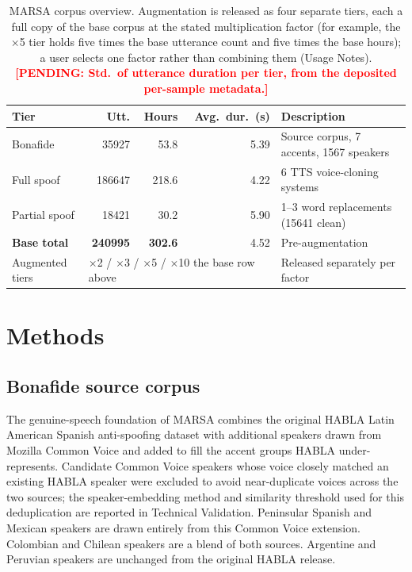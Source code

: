 \documentclass[11pt]{article}
\newcommand{\PENDING}[1]{\textcolor{red}{\textbf{[PENDING: #1]}}}
\begin{document}
\begin{table}[t]
\centering
\caption{MARSA corpus overview. Augmentation is released as four
separate tiers, each a full copy of the base corpus at the stated
multiplication factor (for example, the $\times$5 tier holds five times
the base utterance count and five times the base hours); a user selects
one factor rather than combining them (Usage Notes). \PENDING{Std.\ of
utterance duration per tier, from the deposited per-sample metadata.}}
\label{tab:overview}
\small
\begin{tabular}{lrrrp{3.4cm}}
\toprule
\textbf{Tier} & \textbf{Utt.} & \textbf{Hours} & \textbf{Avg.\ dur.\ (s)} & \textbf{Description} \\
\midrule
Bonafide            & 35927  & 53.8  & 5.39 & Source corpus, 7 accents, 1567 speakers \\
Full spoof          & 186647 & 218.6 & 4.22 & 6 TTS voice-cloning systems \\
Partial spoof       & 18421  & 30.2  & 5.90 & 1--3 word replacements (15641 clean) \\
\midrule
\textbf{Base total} & \textbf{240995} & \textbf{302.6} & 4.52 & Pre-augmentation \\
\midrule
Augmented tiers & \multicolumn{3}{l}{$\times$2 / $\times$3 / $\times$5 / $\times$10 the base row above} & Released separately per factor \\
\bottomrule
\end{tabular}
\end{table}

\section*{Methods}

\subsection*{Bonafide source corpus}

The genuine-speech foundation of MARSA combines the original HABLA
Latin American Spanish anti-spoofing dataset \citep{habla} with
additional speakers drawn from Mozilla Common Voice \citep{commonvoice}
and added to fill the accent groups HABLA under-represents. Candidate
Common Voice speakers whose voice closely matched an existing HABLA
speaker were excluded to avoid near-duplicate voices across the two
sources; the speaker-embedding method and similarity threshold used for
this deduplication are reported in Technical Validation. Peninsular
Spanish and Mexican speakers are drawn entirely from this Common Voice
extension. Colombian and Chilean speakers are a blend of both sources.
Argentine and Peruvian speakers are unchanged from the original HABLA
release.
\end{document}
